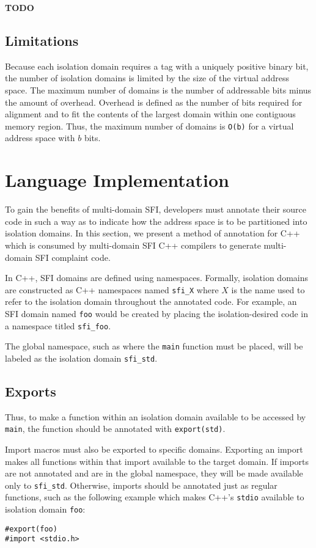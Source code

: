 \documentclass[12pt]{article}
\begin{document}
\textbf{TODO}

\subsection{Limitations}

Because each isolation domain requires a tag with a uniquely positive binary bit, the number of isolation domains is limited by the size of the virtual address space. The maximum number of domains is the number of addressable bits minus the amount of overhead. Overhead is defined as the number of bits required for alignment and to fit the contents of the largest domain within one contiguous memory region. Thus, the maximum number of domains is \texttt{O(b)} for a virtual address space with $b$ bits.

\section{Language Implementation}

To gain the benefits of multi-domain SFI, developers must annotate their source code in such a way as to indicate how the address space is to be partitioned into isolation domains. In this section, we present a method of annotation for C++ which is consumed by multi-domain SFI C++ compilers to generate multi-domain SFI complaint code.

In C++, SFI domains are defined using namespaces. Formally, isolation domains are constructed as C++ namespaces named \texttt{sfi\_X} where $X$ is the name used to refer to the isolation domain throughout the annotated code. For example, an SFI domain named \texttt{foo} would be created by placing the isolation-desired code in a namespace titled \texttt{sfi\_foo}.

The global namespace, such as where the \texttt{main} function must be placed, will be labeled as the isolation domain \texttt{sfi\_std}.

\subsection{Exports} \label{exports}

Thus, to make a function within an isolation domain available to be accessed by \texttt{main}, the function should be annotated with \texttt{export(std)}.

Import macros must also be exported to specific domains. Exporting an import makes all functions within that import available to the target domain. If imports are not annotated and are in the global namespace, they will be made available only to \texttt{sfi\_std}. Otherwise, imports should be annotated just as regular functions, such as the following example which makes C++'s \texttt{stdio} available to isolation domain \texttt{foo}:
\begin{verbatim}
#export(foo)
#import <stdio.h>
\end{verbatim}
\end{document}
